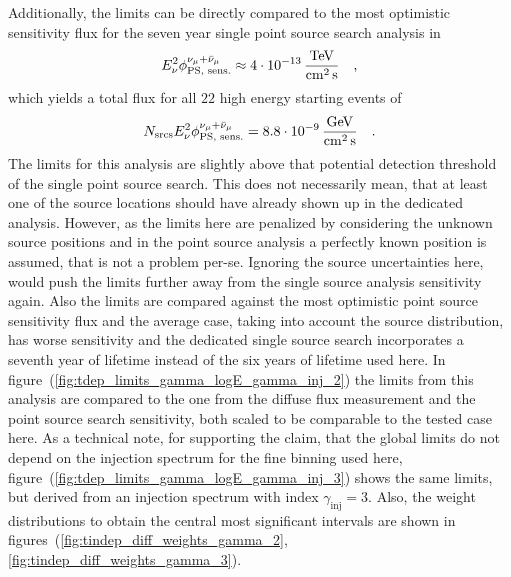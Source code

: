 Additionally, the limits can be directly compared to the most optimistic sensitivity flux for the seven year single point source search analysis in \cite{Aartsen:2016oji}
\begin{equation}
  E_\nu^2\phi^{\nu_\mu+\bar{\nu}_\mu}_\text{PS, sens.}
  \approx \SI{4e-13}{\TeV\per\cm\squared\per\second}
  \mcomma
\end{equation}
which yields a total flux for all $\num{22}$ high energy starting events of
\begin{equation}
  N_\text{srcs} E_\nu^2\phi^{\nu_\mu+\bar{\nu}_\mu}_\text{PS, sens.}
  = \SI{8.8e-9}{\GeV\per\cm\squared\per\second}
  \mperiod
\end{equation}
The limits for this analysis are slightly above that potential detection threshold of the single point source search.
This does not necessarily mean, that at least one of the source locations should have already shown up in the dedicated analysis.
However, as the limits here are penalized by considering the unknown source positions and in the point source analysis a perfectly known position is assumed, that is not a problem per-se.
Ignoring the source uncertainties here, would push the limits further away from the single source analysis sensitivity again.
Also the limits are compared against the most optimistic point source sensitivity flux and the average case, taking into account the source distribution, has worse sensitivity and the dedicated single source search incorporates a seventh year of lifetime instead of the six years of lifetime used here.
In figure~(\ref{fig:tdep_limits_gamma_logE_gamma_inj_2}) the limits from this analysis are compared to the one from the diffuse flux measurement and the point source search sensitivity, both scaled to be comparable to the tested case here.
As a technical note, for supporting the claim, that the global limits do not depend on the injection spectrum for the fine binning used here, figure~(\ref{fig:tdep_limits_gamma_logE_gamma_inj_3}) shows the same limits, but derived from an injection spectrum with index $\gamma_\text{inj}=3$.
Also, the weight distributions to obtain the central most significant intervals are shown in figures~(\ref{fig:tindep_diff_weights_gamma_2}, \ref{fig:tindep_diff_weights_gamma_3}).

